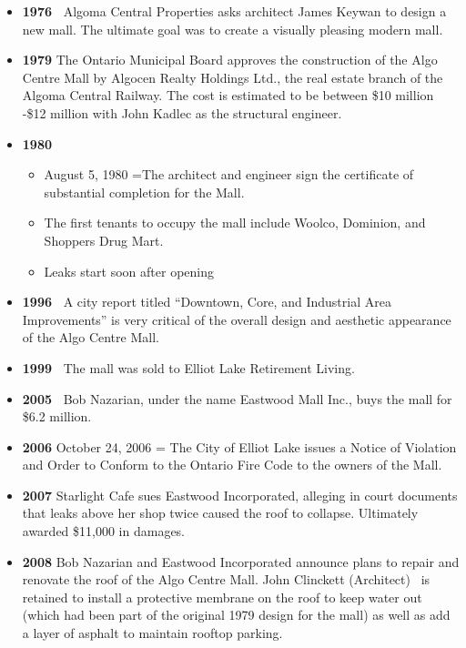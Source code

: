 \documentclass[12pt]{article}
\begin{document}
\begin{itemize}
    \item \textbf{\textbf{1976 }}
Algoma Central Properties asks architect James Keywan to design a new mall. The ultimate goal was to create a visually pleasing modern mall. 

    \item \textbf{\textbf{1979}}
The Ontario Municipal Board approves the construction of the Algo Centre Mall by Algocen Realty Holdings Ltd., the real estate branch of the Algoma Central Railway. The cost is estimated to be between \$10 million -\$12 million with John Kadlec as the structural engineer.

    \item \textbf{\textbf{1980}}
    \begin{itemize}
        \item August 5, 1980 =The architect and engineer sign the certificate of substantial completion for the Mall.
        \item The first tenants to occupy the mall include Woolco, Dominion, and Shoppers Drug Mart.
        \item Leaks start soon after opening 
    \end{itemize}
    \item \textbf{\textbf{1996 }}
A city report titled “Downtown, Core, and Industrial Area Improvements” is very critical of the overall design and aesthetic appearance of the Algo Centre Mall.

    \item \textbf{\textbf{1999 }}
The mall was sold to Elliot Lake Retirement Living.

    \item \textbf{\textbf{2005 }}
Bob Nazarian, under the name Eastwood Mall Inc., buys the mall for \$6.2 million.

    \item \textbf{\textbf{2006}}
October 24, 2006 = The City of Elliot Lake issues a Notice of Violation and Order to Conform to the Ontario Fire Code to the owners of the Mall.

    \item \textbf{\textbf{2007}}
Starlight Cafe sues Eastwood Incorporated, alleging in court documents that leaks above her shop twice caused the roof to collapse. Ultimately awarded \$11,000 in damages.

    \item \textbf{\textbf{2008}}
Bob Nazarian and Eastwood Incorporated announce plans to repair and renovate the roof of the Algo Centre Mall. John Clinckett (Architect)  is retained to install a protective membrane on the roof to keep water out (which had been part of the original 1979 design for the mall) as well as add a layer of asphalt to maintain rooftop parking.


\end{itemize}
\end{document}
